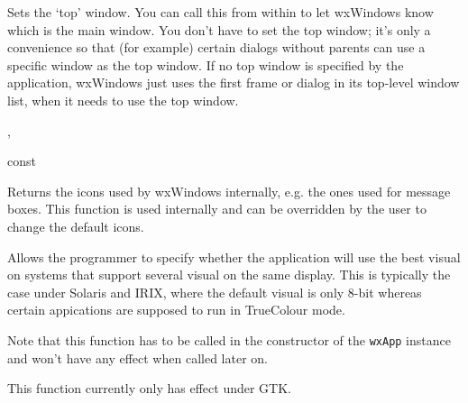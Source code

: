 \label{wxappsettopwindow}


Sets the `top' window. You can call this from within  to
let wxWindows know which is the main window. You don't have to set the top window;
it's only a convenience so that (for example) certain dialogs without parents can use a
specific window as the top window. If no top window is specified by the application,
wxWindows just uses the first frame or dialog in its top-level window list, when it
needs to use the top window.




, 

\label{wxappgetstdicon}

 const

Returns the icons used by wxWindows internally, e.g. the ones used for 
message boxes.  This function is used internally and 
can be overridden by the user to change the default icons.



\label{wxappsetusebestvisual}


Allows the programmer to specify whether the application will use the best visual
on systems that support several visual on the same display. This is typically the
case under Solaris and IRIX, where the default visual is only 8-bit whereas certain
appications are supposed to run in TrueColour mode.

Note that this function has to be called in the constructor of the {\tt wxApp}
instance and won't have any effect when called later on.

This function currently only has effect under GTK.


